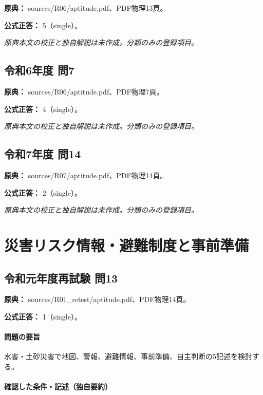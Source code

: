 \noindent\textbf{原典：} sources/R06/aptitude.pdf、PDF物理13頁。

\textbf{公式正答：} 5（single）。

\par\textit{原典本文の校正と独自解説は未作成。分類のみの登録項目。}

\subsection{令和6年度 問7}
\label{q:r06-reg-apt-07}

\noindent\textbf{原典：} sources/R06/aptitude.pdf、PDF物理7頁。

\textbf{公式正答：} 4（single）。

\par\textit{原典本文の校正と独自解説は未作成。分類のみの登録項目。}

\subsection{令和7年度 問14}
\label{q:r07-reg-apt-14}

\noindent\textbf{原典：} sources/R07/aptitude.pdf、PDF物理14頁。

\textbf{公式正答：} 2（single）。

\par\textit{原典本文の校正と独自解説は未作成。分類のみの登録項目。}

\section{災害リスク情報・避難制度と事前準備}

\subsection{令和元年度再試験 問13}
\label{q:r01-ret-apt-13}

\noindent\textbf{原典：} sources/R01\_retest/aptitude.pdf、PDF物理14頁。

\textbf{公式正答：} 1（single）。

\paragraph{問題の要旨} 水害・土砂災害で地図、警報、避難情報、事前準備、自主判断の5記述を検討する。

\paragraph{確認した条件・記述（独自要約）}\mbox{}\par

